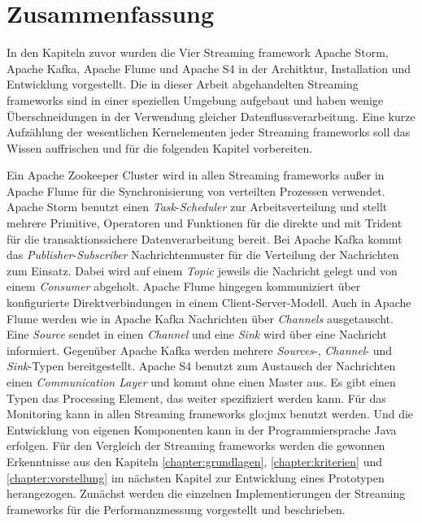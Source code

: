 \section{Zusammenfassung}

In den Kapiteln zuvor wurden die Vier Streaming framework Apache Storm, Apache Kafka, Apache Flume und Apache S4 in der Architktur, Installation und Entwicklung vorgestellt. Die in dieser Arbeit abgehandelten Streaming frameworks sind in einer speziellen Umgebung aufgebaut und haben wenige Überschneidungen in der Verwendung gleicher Datenflussverarbeitung. Eine kurze Aufzählung der wesentlichen Kernelementen jeder Streaming frameworks soll das Wissen auffrischen und für die folgenden Kapitel vorbereiten.

Ein Apache Zookeeper Cluster wird in allen Streaming frameworks außer in Apache Flume für die Synchronisierung von verteilten Prozessen verwendet. 
Apache Storm benutzt einen \textit{Task}-\textit{Scheduler} zur Arbeitsverteilung und stellt mehrere Primitive, Operatoren und Funktionen für die direkte und mit Trident für die transaktionssichere Datenverarbeitung bereit. Bei Apache Kafka kommt das \textit{Publisher}-\textit{Subscriber} Nachrichtenmuster für die Verteilung der Nachrichten zum Einsatz. Dabei wird auf einem \textit{Topic} jeweils die Nachricht gelegt und von einem \textit{Consumer} abgeholt. Apache Flume hingegen kommuniziert über konfigurierte Direktverbindungen in einem Client-Server-Modell. Auch in Apache Flume werden wie in Apache Kafka Nachrichten über \textit{Channels} ausgetauscht. Eine \textit{Source} sendet in einen \textit{Channel} und eine \textit{Sink} wird über eine Nachricht informiert. Gegenüber Apache Kafka werden mehrere \textit{Sources}-, \textit{Channel}- und \textit{Sink}-Typen bereitgestellt. Apache S4 benutzt zum Austausch der Nachrichten einen \textit{Communication Layer} und kommt ohne einen Master aus. Es gibt einen Typen das Processing Element, das weiter spezifiziert werden kann. Für das Monitoring kann in allen Streaming frameworks \gls{glo:jmx} benutzt werden. Und die Entwicklung von eigenen Komponenten kann in der Programmiersprache Java erfolgen. Für den Vergleich der Streaming frameworks werden die gewonnen Erkenntnisse aus den Kapiteln \ref{chapter:grundlagen}, \ref{chapter:kriterien} und \ref{chapter:vorstellung} im nächsten Kapitel zur Entwicklung eines Prototypen herangezogen. Zunächst werden die einzelnen Implementierungen der Streaming frameworks für die Performanzmessung vorgestellt und beschrieben.